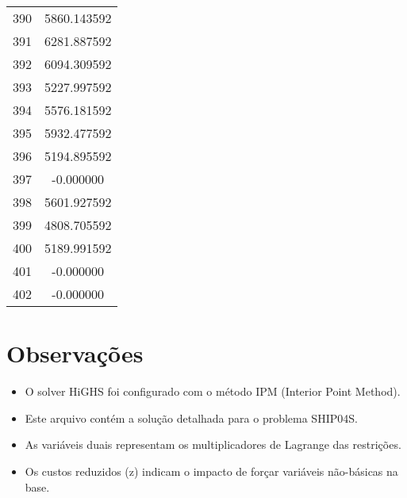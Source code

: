 \documentclass[12pt]{article}
\begin{document}
\begin{longtable}{@{}cc@{}}
390 & 5860.143592 \\
391 & 6281.887592 \\
392 & 6094.309592 \\
393 & 5227.997592 \\
394 & 5576.181592 \\
395 & 5932.477592 \\
396 & 5194.895592 \\
397 & -0.000000 \\
398 & 5601.927592 \\
399 & 4808.705592 \\
400 & 5189.991592 \\
401 & -0.000000 \\
402 & -0.000000 \\

\end{longtable}


\section{Observações}

\begin{itemize}
\item O solver HiGHS foi configurado com o método IPM (Interior Point Method).
\item Este arquivo contém a solução detalhada para o problema SHIP04S.
\item As variáveis duais representam os multiplicadores de Lagrange das restrições.
\item Os custos reduzidos (z) indicam o impacto de forçar variáveis não-básicas na base.
\end{itemize}
\end{document}
